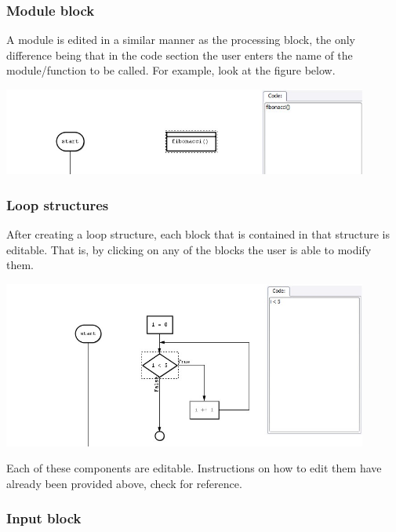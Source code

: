 \documentclass[11pt,a4paper,titlepage]{article}
\begin{document}
	\subsubsection{Module block}
	
	A module is edited in a similar manner as the processing block, the only difference being that in the code section the user enters the name of the module/function to be called. For example, look at the figure below. \newline \newline
	
	\includegraphics[width=12cm]{images/editModule.jpg} \newline
	
	\subsubsection{Loop structures}
	
	After creating a loop structure, each block that is contained in that structure is editable. That is, by clicking on any of the blocks the user is able to modify them. \newline \newline
	
	\includegraphics[width=12cm]{images/editLoop.jpg} \newline
	
	Each of these components are editable. Instructions on how to edit them have already been provided above, check for reference.\newline
	
	\subsubsection{Input block}
	
\end{document}
